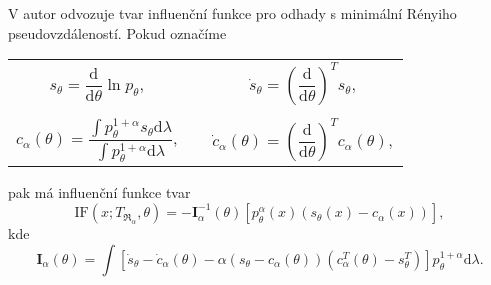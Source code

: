 V \cite{Vajda2009} autor odvozuje tvar influenční funkce pro odhady s minimální Rényiho pseudovzdáleností. Pokud označíme 
\begin{center}
	\begin{tabular}{c c}
	$s_\theta = \dfrac{\mathrm{d}}{\mathrm{d}\theta} \ln p_\theta, \quad$ & $ \dot{s}_\theta = \left( \dfrac{\mathrm{d}}{\mathrm{d}\theta} \right)^T s_\theta,$ \\ 
	&\\
	$c_\alpha(\theta) = \dfrac{\int p_\theta^{1+\alpha}s_\theta \mathrm{d}\lambda}{\int p_\theta^{1+\alpha} \mathrm{d}\lambda}, \quad$ & $\dot{c}_\alpha(\theta)= \left( \dfrac{\mathrm{d}}{\mathrm{d}\theta} \right)^T c_\alpha(\theta),$  \\ 
	\end{tabular} 
\end{center}
pak má influenční funkce tvar 
\begin{equation}
	\mathrm{IF}(x;T_{\mathfrak{R}_\alpha},\theta) = -\mathbf{I}^{-1}_{\alpha}(\theta) \left[ p_\theta^\alpha(x) (s_\theta (x) - c_\alpha (x)) \right], 
	\label{IF}
\end{equation}
kde 
\begin{equation}
\mathbf{I}_{\alpha}(\theta) = \int{ \left[\dot{s}_\theta - \dot{c}_\alpha(\theta) - \alpha(s_\theta - c_\alpha(\theta))(c^T_\alpha(\theta) - s^T_\theta) \right] p_\theta^{1+\alpha} \mathrm{d}\lambda}.
\end{equation}
